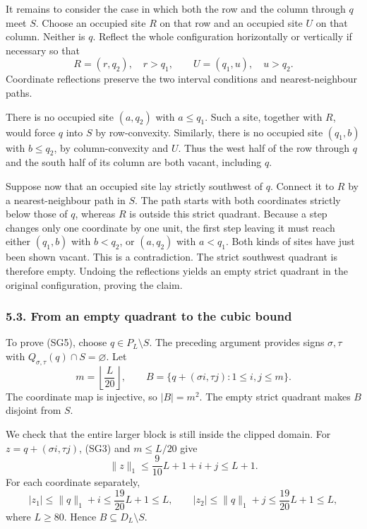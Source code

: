 \documentclass[
  11pt,
  a4paper,
]{article}
\begin{document}
It remains to consider the case in which both the row and the column
through \(q\) meet \(S\). Choose an occupied site \(R\) on that row and
an occupied site \(U\) on that column. Neither is \(q\). Reflect the
whole configuration horizontally or vertically if necessary so that \[
R=(r,q_2),\quad r>q_1,\qquad
U=(q_1,u),\quad u>q_2.
\] Coordinate reflections preserve the two interval conditions and
nearest-neighbour paths.

There is no occupied site \((a,q_2)\) with \(a\leq q_1\). Such a site,
together with \(R\), would force \(q\) into \(S\) by row-convexity.
Similarly, there is no occupied site \((q_1,b)\) with \(b\leq q_2\), by
column-convexity and \(U\). Thus the west half of the row through \(q\)
and the south half of its column are both vacant, including \(q\).

Suppose now that an occupied site lay strictly southwest of \(q\).
Connect it to \(R\) by a nearest-neighbour path in \(S\). The path
starts with both coordinates strictly below those of \(q\), whereas
\(R\) is outside this strict quadrant. Because a step changes only one
coordinate by one unit, the first step leaving it must reach either
\((q_1,b)\) with \(b<q_2\), or \((a,q_2)\) with \(a<q_1\). Both kinds of
sites have just been shown vacant. This is a contradiction. The strict
southwest quadrant is therefore empty. Undoing the reflections yields an
empty strict quadrant in the original configuration, proving the claim.

\subsubsection{5.3. From an empty quadrant to the cubic
bound}\label{from-an-empty-quadrant-to-the-cubic-bound}

To prove (SG5), choose \(q\in P_L\setminus S\). The preceding argument
provides signs \(\sigma,\tau\) with
\(Q_{\sigma,\tau}(q)\cap S=\varnothing\). Let \[
m=\left\lfloor\frac L{20}\right\rfloor,\qquad
B=\{q+(\sigma i,\tau j):1\leq i,j\leq m\}.
\tag{SG7}
\] The coordinate map is injective, so \(|B|=m^2\). The empty strict
quadrant makes \(B\) disjoint from \(S\).

We check that the entire larger block is still inside the clipped
domain. For \(z=q+(\sigma i,\tau j)\), (SG3) and \(m\leq L/20\) give \[
\|z\|_1\leq\frac9{10}L+1+i+j\leq L+1.
\] For each coordinate separately, \[
|z_1|\leq\|q\|_1+i\leq\frac{19}{20}L+1\leq L,
\qquad
|z_2|\leq\|q\|_1+j\leq\frac{19}{20}L+1\leq L,
\] where \(L\geq80\). Hence \(B\subseteq D_L\setminus S\).
\end{document}
